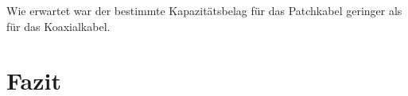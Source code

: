 \documentclass[12pt,a4paper]{article}
\begin{document}
Wie erwartet war der bestimmte Kapazitätsbelag für das Patchkabel geringer als für das Koaxialkabel.


\section{Fazit}
\end{document}

